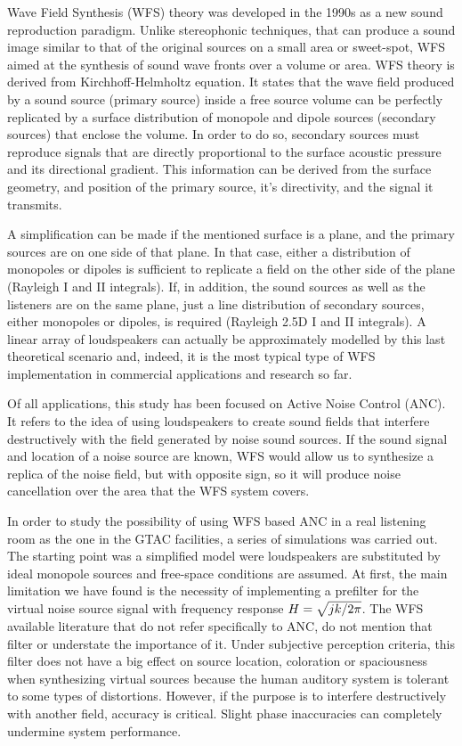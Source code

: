 Wave Field Synthesis (WFS) theory was developed in the 1990s as a new sound reproduction paradigm. Unlike stereophonic techniques, that can produce a sound image similar to that of the original sources on a small area or sweet-spot, WFS aimed at the synthesis of sound wave fronts over a volume or area. WFS theory is derived from Kirchhoff-Helmholtz equation. It states that the wave field produced by a sound source (primary source) inside a free source volume can be perfectly replicated by a surface distribution of monopole and dipole sources (secondary sources) that enclose the volume. In order to do so, secondary sources must reproduce signals that are directly proportional to the surface acoustic pressure and its directional gradient. This information can be derived from the surface geometry, and position of the primary source, it's directivity, and the signal it transmits.

A simplification can be made if the mentioned surface is a plane, and the primary sources are on one side of that plane. In that case, either a distribution of monopoles or dipoles is sufficient to replicate a field on the other side of the plane (Rayleigh I and II integrals). If, in addition, the sound sources as well as the listeners are on the same plane, just a line distribution of secondary sources, either monopoles or dipoles, is required (Rayleigh 2.5D I and II integrals). A linear array of loudspeakers can actually be approximately modelled by this last theoretical scenario and, indeed, it is the most typical type of WFS implementation in commercial applications and research so far.

Of all applications, this study has been focused on Active Noise Control (ANC). It refers to the idea of using loudspeakers to create sound fields that interfere destructively with the field generated by noise sound sources. If the sound signal and location of a noise source are known, WFS would allow us to synthesize a replica of the noise field, but with opposite sign, so it will produce noise cancellation over the area that the WFS system covers.

In order to study the possibility of using WFS based ANC in a real listening room as the one in the GTAC facilities, a series of simulations was carried out. The starting point was a simplified model were loudspeakers are substituted by ideal monopole sources and free-space conditions are assumed. At first, the main limitation we have found is the necessity of implementing a prefilter for the virtual noise source signal with frequency response $\freqFilter[frequency] = \sqrt{jk/2\pi}$. The WFS available literature that do not refer specifically to ANC, do not mention that filter or understate the importance of it. Under subjective perception criteria, this filter does not have a big effect on source location, coloration or spaciousness when synthesizing virtual sources because the human auditory system is tolerant to some types of distortions. However, if the purpose is to interfere destructively with another field, accuracy is critical. Slight phase inaccuracies can completely undermine system performance.


